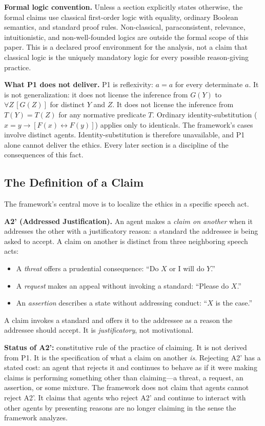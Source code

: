 \documentclass[11pt]{article}
\def\ensuremath#1{#1}%
\def\mathrm#1{#1}%
\newcommand{\Atwo}{\texorpdfstring{\ensuremath{\mathrm{A2}'}}{A2'}}
\begin{document}
\textbf{Formal logic convention.} Unless a section explicitly states otherwise, the formal claims use classical first-order logic with equality, ordinary Boolean semantics, and standard proof rules. Non-classical, paraconsistent, relevance, intuitionistic, and non-well-founded logics are outside the formal scope of this paper. This is a declared proof environment for the analysis, not a claim that classical logic is the uniquely mandatory logic for every possible reason-giving practice.

\textbf{What P1 does not deliver.} P1 is reflexivity: $a = a$ for every determinate $a$. It is not generalization: it does not license the inference from $G(Y)$ to $\forall Z\,[G(Z)]$ for distinct $Y$ and $Z$. It does not license the inference from $T(Y) = T(Z)$ for any normative predicate $T$. Ordinary identity-substitution ($x = y \to [F(x) \leftrightarrow F(y)]$) applies only to identicals. The framework's cases involve distinct agents. Identity-substitution is therefore unavailable, and P1 alone cannot deliver the ethics. Every later section is a discipline of the consequences of this fact.

\subsection{The Definition of a Claim}
The framework's central move is to localize the ethics in a specific speech act.
\begin{paperbox}
\textbf{\Atwo{} (Addressed Justification).} An agent makes a \emph{claim on another} when it addresses the other with a justificatory reason: a standard the addressee is being asked to accept. A claim on another is distinct from three neighboring speech acts:
\begin{itemize}
\item A \emph{threat} offers a prudential consequence: ``Do $X$ or I will do $Y$.''
\item A \emph{request} makes an appeal without invoking a standard: ``Please do $X$.''
\item An \emph{assertion} describes a state without addressing conduct: ``$X$ is the case.''
\end{itemize}
A claim invokes a standard and offers it to the addressee as a reason the addressee should accept. It is \emph{justificatory}, not motivational.
\end{paperbox}

\textbf{Status of \Atwo{}:} constitutive rule of the practice of claiming. It is not derived from P1. It is the specification of what a claim on another \emph{is}. Rejecting \Atwo{} has a stated cost: an agent that rejects it and continues to behave as if it were making claims is performing something other than claiming---a threat, a request, an assertion, or some mixture. The framework does not claim that agents cannot reject \Atwo{}. It claims that agents who reject \Atwo{} and continue to interact with other agents by presenting reasons are no longer claiming in the sense the framework analyzes.
\end{document}
